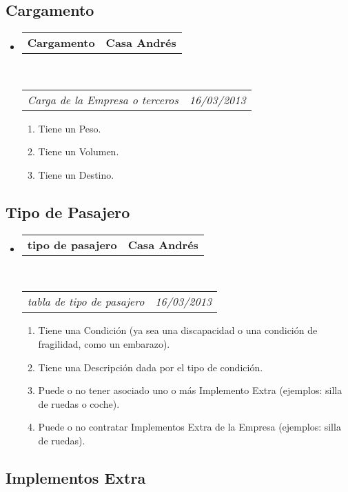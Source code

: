 \documentclass[10pt,letterpaper]{article}
\makeatletter
\newcommand{\headerrow}[2]
{\begin{tabular*}{\linewidth}{l@{\extracolsep{\fill}}r}
	#1 &
	#2 \\
\end{tabular*}}
\makeatother
\begin{document}
\subsection*{Cargamento}

\begin{itemize}
	\parskip=0.1em

	\item
	\headerrow
		{\textbf{Cargamento}}
		{\textbf{Casa Andrés}}
	\\
	\headerrow
		{\emph{Carga de la Empresa o terceros}}
		{\emph{16/03/2013}}
	\begin{enumerate}
		\item Tiene un Peso.
		\item Tiene un Volumen.
		\item Tiene un Destino.
	\end{enumerate}

\end{itemize}

\subsection*{Tipo de Pasajero}

\begin{itemize}
	\parskip=0.1em

	\item
	\headerrow
		{\textbf{tipo de pasajero}}
		{\textbf{Casa Andrés}}
	\\
	\headerrow
		{\emph{tabla de tipo de pasajero}}
		{\emph{16/03/2013}}
	\begin{enumerate}
		\item Tiene una Condición (ya sea una discapacidad o una condición de fragilidad, como un embarazo).
		\item Tiene una Descripción dada por el tipo de condición.
		\item Puede o no tener asociado uno o más Implemento Extra (ejemplos: silla de ruedas o coche).
		\item Puede o no contratar Implementos Extra de la Empresa (ejemplos: silla de ruedas).
	\end{enumerate}

\end{itemize}


\subsection*{Implementos Extra}
\end{document}
